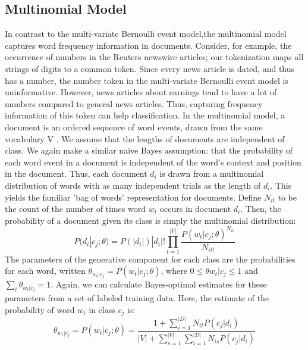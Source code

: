\documentclass[journal]{IEEEtran}
\begin{document}
\subsection{Multinomial Model}
In contrast to the multi-variate Bernoulli event model,the multinomial model captures word frequency information in documents. Consider, for example, the occurrence of numbers in the Reuters newswire articles; our tokenization maps all strings of digits to a common token. Since every news article is dated, and thus has a number, the number token in the multi-variate Bernoulli event model is uninformative. However, news articles about earnings tend to have a lot of numbers compared to general news articles. Thus, capturing frequency information of this token can help classification.
In the multinomial model, a document is an ordered sequence of word events, drawn from the same vocabulary V . We assume that the lengths of documents are independent of class. We again make a similar naive Bayes assumption: that the probability of each word event in a document is independent of the word's context and position in the document. Thus, each document $d_i$ is drawn from a multinomial distribution of words with as many independent trials as the length of $d_{i}$. This yields the familiar 'bag of words' representation for documents. Define $N_{it}$ to be the count of the number of times word $w_t$ occurs in document $d_{i}$.
Then, the probability of a document given its class is simply the multinomial distribution:
\begin{equation}	
	P(d_{i}|c_{j};\theta)=P(|d_{i}|)|d_{i}|!\prod_{t=1}^{|V|}\frac{P(w_{t}|c_{j};\theta)^{N_{it}}}{N_{it!}}	
\end{equation}
The parameters of the generative component for each class are the probabilities for each word, written $\theta_{ w_{t} |c_{j}} = P(w_{t}|c_{j}; \theta)$, where $0 \le \theta w_{t} |c_{j} \le 1$ and $\sum_{t} \theta_{ w_{t} |c_{j} }= 1$.
Again, we can calculate Bayes-optimal estimates for these parameters from a set of labeled training data. Here, the estimate of the probability of word $w_{t}$ in class $c_{j}$ is:
\begin{equation}
	\theta_{w_{t}|c_{j}}=P(w_{t}|c_{j};\theta)=\frac{1+\sum_{i=1}^{|D|}N_{it}P(c_{j}|d_{i})}{|V|+\sum_{s=1}^{|V|}\sum_{i=1}^{|D|}N_{is}P(c_{j}|d_{i})}
\end{equation}
\end{document}
